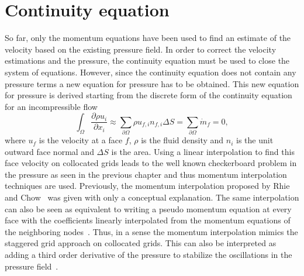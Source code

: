 \section{Continuity equation}
So far, only the momentum equations have been used to find an estimate of the velocity based on the existing pressure field. In order to correct the velocity estimations and the pressure, the continuity equation must be used to close the system of equations. However, since the continuity equation does not contain any pressure terms a new equation for pressure has to be obtained. This new equation for pressure is derived starting from the discrete form of the continuity equation for an incompressible flow 
\begin{equation}
    \int_{\Omega}\frac{\partial \rho u_i}{\partial x_i} \approx \sum_{\partial \Omega}\rho u_{f,i} n_{f,i}\Delta S = \sum_{\partial \Omega}\dot{m}_{f} = 0 ,
    \label{eq:mfeqn}
\end{equation}
where $u_f$ is the velocity at a face $f$, $\rho$ is the fluid density and $n_i$ is the unit outward face normal and $\Delta S$ is the area. Using a linear interpolation to find this face velocity on collocated grids leads to the well known checkerboard problem in the pressure as seen in the previous chapter and thus momentum interpolation techniques are used. Previously, the momentum interpolation proposed by Rhie and Chow~\cite{Rhie1983} was given with only a conceptual explanation. The same interpolation can also be seen as equivalent to writing a pseudo momentum equation at every face with the coefficients linearly interpolated from the momentum equations of the neighboring nodes~\cite{Moukalled}. Thus, in a sense the momentum interpolation mimics the staggered grid approach on collocated grids. This can also be interpreted as adding a third order derivative of the pressure to stabilize the oscillations in the pressure field~\cite{Ferziger2002}.

